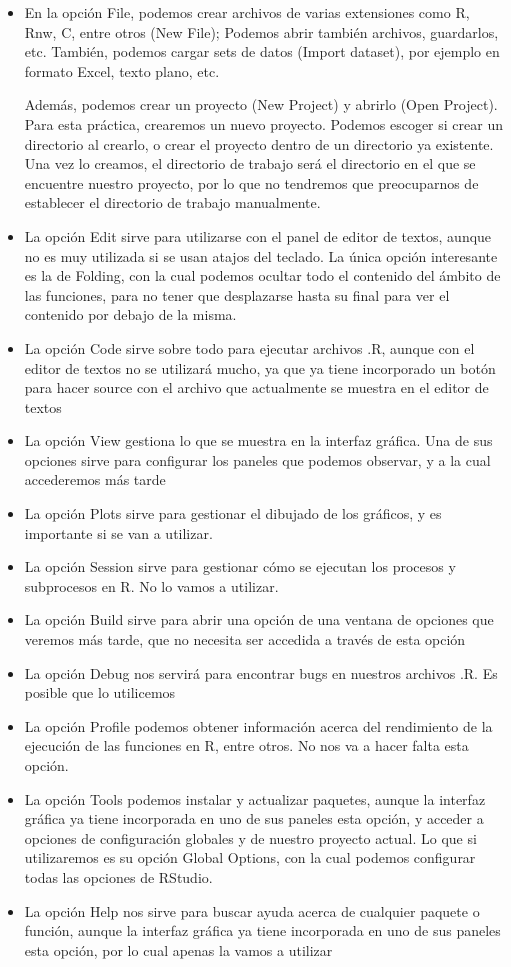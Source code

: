 \documentclass[parskip=full]{scrartcl}
\begin{document}
\begin{enumerate}
\begin{itemize}
    \item 
    En la opción File, podemos crear archivos de varias extensiones como R, Rnw, C, entre otros (New File); Podemos abrir también archivos, guardarlos, etc. También, podemos cargar sets de datos (Import dataset), por ejemplo en formato Excel, texto plano, etc.
    
    Además, podemos crear un proyecto (New Project) y abrirlo (Open Project). Para esta práctica, crearemos un nuevo proyecto. Podemos escoger si crear un directorio al crearlo, o crear el proyecto dentro de un directorio ya existente. Una vez lo creamos, el directorio de trabajo será el directorio en el que se encuentre nuestro proyecto, por lo que no tendremos que preocuparnos de establecer el directorio de trabajo manualmente.
    \item La opción Edit sirve para utilizarse con el panel de editor de textos, aunque no es muy utilizada si se usan atajos del teclado. La única opción interesante es la de Folding, con la cual podemos ocultar todo el contenido del ámbito de las funciones, para no tener que desplazarse hasta su final para ver el contenido por debajo de la misma.
    \item La opción Code sirve sobre todo para ejecutar archivos .R, aunque con el editor de textos no se utilizará mucho, ya que ya tiene incorporado un botón para hacer source con el archivo que actualmente se muestra en el editor de textos
    \item La opción View gestiona lo que se muestra en la interfaz gráfica. Una de sus opciones sirve para configurar los paneles que podemos observar, y a la cual accederemos más tarde
    \item La opción Plots sirve para gestionar el dibujado de los gráficos, y es importante si se van a utilizar.
    \item La opción Session sirve para gestionar cómo se ejecutan los procesos y subprocesos en R. No lo vamos a utilizar.
    \item La opción Build sirve para abrir una opción de una ventana de opciones que veremos más tarde, que no necesita ser accedida a través de esta opción
    \item La opción Debug nos servirá para encontrar bugs en nuestros archivos .R. Es posible que lo utilicemos
    \item La opción Profile podemos obtener información acerca del rendimiento de la ejecución de las funciones en R, entre otros. No nos va a hacer falta esta opción.
    \item La opción Tools podemos instalar y actualizar paquetes, aunque la interfaz gráfica ya tiene incorporada en uno de sus paneles esta opción, y acceder a opciones de configuración globales y de nuestro proyecto actual. Lo que si utilizaremos es su opción Global Options, con la cual podemos configurar todas las opciones de RStudio.
    \item La opción Help nos sirve para buscar ayuda acerca de cualquier paquete o función, aunque la interfaz gráfica ya tiene incorporada en uno de sus paneles esta opción, por lo cual apenas la vamos a utilizar
\end{itemize}


\end{enumerate}
\end{document}
